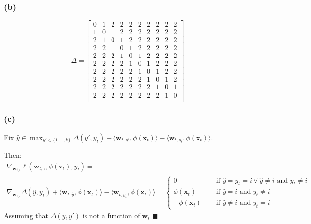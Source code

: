 \documentclass[11pt, oneside]{article}   	%
\begin{document}
\subsubsection{(b)}
 \[
   \Delta =
  \left[ {\begin{array}{cccccccccc}
   0 & 1 & 2 & 2 & 2 & 2 & 2 & 2 & 2 & 2\\
   1 & 0 & 1 & 2 & 2 & 2 & 2 & 2 & 2 & 2\\
   2 & 1 & 0 & 1 & 2 & 2 & 2 & 2 & 2 & 2\\
   2 & 2 & 1 & 0 & 1 & 2 & 2 & 2 & 2 & 2\\
   2 & 2 & 2 & 1 & 0 & 1 & 2 & 2 & 2 & 2\\
   2 & 2 & 2 & 2 & 1 & 0 & 1 & 2 & 2 & 2\\
   2 & 2 & 2 & 2 & 2 & 1 & 0 & 1 & 2 & 2\\
   2 & 2 & 2 & 2 & 2 & 2 & 1 & 0 & 1 & 2\\
   2 & 2 & 2 & 2 & 2 & 2 & 2 & 1 & 0 & 1\\
   2 & 2 & 2 & 2 & 2 & 2 & 2 & 2 & 1 & 0\\
  \end{array} } \right]
\]

\newpage{}
\subsubsection{(c)}
Fix $\hat{y} \in \max_{y' \in \{1, \ldots, k\}} \Delta(y', y_t) + \langle \boldsymbol{w}_{t, y'}, \phi(\boldsymbol{x}_t) \rangle - \langle \boldsymbol{w}_{t, y_t}, \phi(\boldsymbol{x}_t) \rangle$.  

Then:
\begin{gather*}
\nabla_{\boldsymbol{w}_{t, i}}\ell(\boldsymbol{w}_{t, i}, \phi(\boldsymbol{x}_t), y_t) = \\
\nabla_{\boldsymbol{w}_{t, i}} \Delta(\hat{y}, y_t) + \langle \boldsymbol{w}_{t, \hat{y}}, \phi(\boldsymbol{x}_t) \rangle - \langle \boldsymbol{w}_{t, y_t}, \phi(\boldsymbol{x}_t) \rangle =
\begin{cases} 
0 &\quad\text{ if $\hat{y} = y_t = i \lor \hat{y} \neq i$ and $y_t \neq i$ }\\
\phi(\boldsymbol{x}_t) &\quad\text{ if $\hat{y} = i$ and $y_t \neq i$}\\
-\phi(\boldsymbol{x}_t) &\quad\text{ if $\hat{y} \neq i$ and $y_t = i$}
\end{cases}
\end{gather*}
Assuming that $\Delta(y, y')$ is not a function of $\boldsymbol{w}_t$ $\blacksquare$
\end{document}
